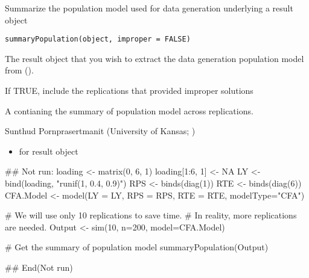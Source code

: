 \documentclass[a4paper]{book}
\begin{document}
%
\begin{Description}\relax
Summarize the population model used for data generation underlying a result object
\end{Description}
%
\begin{Usage}
\begin{verbatim}
summaryPopulation(object, improper = FALSE)
\end{verbatim}
\end{Usage}
%
\begin{Arguments}
\begin{ldescription}
\item[\code{object}] 
The result object that you wish to extract the data generation population model from ().

\item[\code{improper}] 
If TRUE, include the replications that provided improper solutions

\end{ldescription}
\end{Arguments}
%
\begin{Value}
A  contianing the summary of population model across replications.
\end{Value}
%
\begin{Author}\relax
Sunthud Pornprasertmanit (University of Kansas; )
\end{Author}
%
\begin{SeeAlso}\relax
\begin{itemize}

\item {} for result object

\end{itemize}

\end{SeeAlso}
%
\begin{Examples}
\begin{ExampleCode}
## Not run: 
loading <- matrix(0, 6, 1)
loading[1:6, 1] <- NA
LY <- bind(loading, "runif(1, 0.4, 0.9)")
RPS <- binds(diag(1))
RTE <- binds(diag(6))
CFA.Model <- model(LY = LY, RPS = RPS, RTE = RTE, modelType="CFA")

# We will use only 10 replications to save time.
# In reality, more replications are needed.
Output <- sim(10, n=200, model=CFA.Model)

# Get the summary of population model
summaryPopulation(Output)

## End(Not run)
\end{ExampleCode}
\end{Examples}
\end{document}
